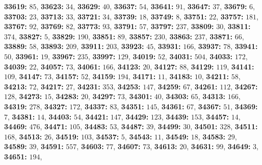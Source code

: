 \textsf{\bfseries 33619:} $85$, \textsf{\bfseries 33623:} $34$, \textsf{\bfseries 33629:} $40$, \textsf{\bfseries 33637:} $54$, \textsf{\bfseries 33641:} $91$, \textsf{\bfseries 33647:} $37$, \textsf{\bfseries 33679:} $6$, \textsf{\bfseries 33703:} $23$, \textsf{\bfseries 33713:} $33$, \textsf{\bfseries 33721:} $34$, \textsf{\bfseries 33739:} $18$, \textsf{\bfseries 33749:} $8$, \textsf{\bfseries 33751:} $22$, \textsf{\bfseries 33757:} $181$, \textsf{\bfseries 33767:} $92$, \textsf{\bfseries 33769:} $82$, \textsf{\bfseries 33773:} $93$, \textsf{\bfseries 33791:} $57$, \textsf{\bfseries 33797:} $237$, \textsf{\bfseries 33809:} $30$, \textsf{\bfseries 33811:} $374$, \textsf{\bfseries 33827:} $5$, \textsf{\bfseries 33829:} $190$, \textsf{\bfseries 33851:} $89$, \textsf{\bfseries 33857:} $230$, \textsf{\bfseries 33863:} $237$, \textsf{\bfseries 33871:} $66$, \textsf{\bfseries 33889:} $58$, \textsf{\bfseries 33893:} $209$, \textsf{\bfseries 33911:} $203$, \textsf{\bfseries 33923:} $45$, \textsf{\bfseries 33931:} $166$, \textsf{\bfseries 33937:} $78$, \textsf{\bfseries 33941:} $50$, \textsf{\bfseries 33961:} $19$, \textsf{\bfseries 33967:} $235$, \textsf{\bfseries 33997:} $129$, \textsf{\bfseries 34019:} $52$, \textsf{\bfseries 34031:} $504$, \textsf{\bfseries 34033:} $172$, \textsf{\bfseries 34039:} $22$, \textsf{\bfseries 34057:} $73$, \textsf{\bfseries 34061:} $166$, \textsf{\bfseries 34123:} $20$, \textsf{\bfseries 34127:} $88$, \textsf{\bfseries 34129:} $119$, \textsf{\bfseries 34141:} $109$, \textsf{\bfseries 34147:} $73$, \textsf{\bfseries 34157:} $52$, \textsf{\bfseries 34159:} $194$, \textsf{\bfseries 34171:} $11$, \textsf{\bfseries 34183:} $10$, \textsf{\bfseries 34211:} $58$, \textsf{\bfseries 34213:} $72$, \textsf{\bfseries 34217:} $27$, \textsf{\bfseries 34231:} $353$, \textsf{\bfseries 34253:} $147$, \textsf{\bfseries 34259:} $67$, \textsf{\bfseries 34261:} $112$, \textsf{\bfseries 34267:} $128$, \textsf{\bfseries 34273:} $15$, \textsf{\bfseries 34283:} $20$, \textsf{\bfseries 34297:} $73$, \textsf{\bfseries 34301:} $40$, \textsf{\bfseries 34303:} $65$, \textsf{\bfseries 34313:} $166$, \textsf{\bfseries 34319:} $278$, \textsf{\bfseries 34327:} $172$, \textsf{\bfseries 34337:} $83$, \textsf{\bfseries 34351:} $145$, \textsf{\bfseries 34361:} $67$, \textsf{\bfseries 34367:} $51$, \textsf{\bfseries 34369:} $7$, \textsf{\bfseries 34381:} $14$, \textsf{\bfseries 34403:} $54$, \textsf{\bfseries 34421:} $147$, \textsf{\bfseries 34429:} $123$, \textsf{\bfseries 34439:} $153$, \textsf{\bfseries 34457:} $14$, \textsf{\bfseries 34469:} $476$, \textsf{\bfseries 34471:} $105$, \textsf{\bfseries 34483:} $53$, \textsf{\bfseries 34487:} $39$, \textsf{\bfseries 34499:} $30$, \textsf{\bfseries 34501:} $328$, \textsf{\bfseries 34511:} $168$, \textsf{\bfseries 34513:} $26$, \textsf{\bfseries 34519:} $103$, \textsf{\bfseries 34537:} $5$, \textsf{\bfseries 34543:} $11$, \textsf{\bfseries 34549:} $18$, \textsf{\bfseries 34583:} $29$, \textsf{\bfseries 34589:} $39$, \textsf{\bfseries 34591:} $557$, \textsf{\bfseries 34603:} $77$, \textsf{\bfseries 34607:} $73$, \textsf{\bfseries 34613:} $20$, \textsf{\bfseries 34631:} $99$, \textsf{\bfseries 34649:} $3$, \textsf{\bfseries 34651:} $194$, 
